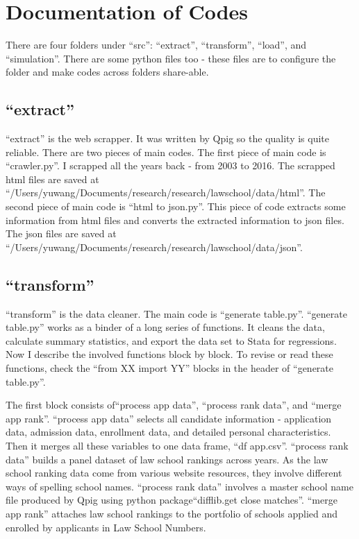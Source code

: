 \documentclass[12pt]{article}
\begin{document}
\section{Documentation of Codes}
There are four folders under ``src'': ``extract'', ``transform'', ``load'', and ``simulation''. There are some python files too - these files are to configure the folder and make codes across folders share-able.

\subsection{``extract''}
``extract'' is the web scrapper. It was written by Qpig so the quality is quite reliable. There are two pieces of main codes. The first piece of main code is ``crawler.py''. I scrapped all the years back - from 2003 to 2016. The scrapped html files are saved at ``/Users/yuwang/Documents/research/research/lawschool/data/html''. The second piece of main code is ``html to json.py''. This piece of code extracts some information from html files and converts the extracted information to json files. The json files are saved at ``/Users/yuwang/Documents/research/research/lawschool/data/json''.

\subsection{``transform''}
``transform'' is the data cleaner. The main code is ``generate table.py''. ``generate table.py'' works as a binder of a long series of functions. It cleans the data, calculate summary statistics, and export the data set to Stata for regressions. Now I describe the involved functions block by block. To revise or read these functions, check the ``from XX import YY'' blocks in the header of ``generate table.py''.

The first block consists of``process app data'', ``process rank data'', and ``merge app rank''. ``process app data'' selects all candidate information - application data, admission data, enrollment data, and detailed personal characteristics. Then it merges all these variables to one data frame, ``df app.csv''. ``process rank data'' builds a panel dataset of law school rankings across years. As the law school ranking data come from various website resources, they involve different ways of spelling school names. ``process rank data'' involves a master school name file produced by Qpig using python package``difflib.get close matches''. ``merge app rank'' attaches law school rankings to the portfolio of schools applied and enrolled by applicants in Law School Numbers. 
\end{document}
